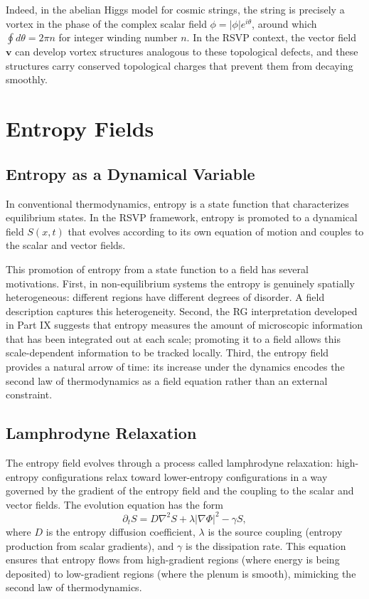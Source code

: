 \documentclass[12pt,a4paper,oneside]{book}
\theoremstyle{definition}
\theoremstyle{plain}
\theoremstyle{remark}
\begin{document}
Indeed, in the abelian Higgs model for cosmic strings, the string is precisely
a vortex in the phase of the complex scalar field $\phi = |\phi|e^{i\theta}$,
around which $\oint d\theta = 2\pi n$ for integer winding number $n$. In the
RSVP context, the vector field $\mathbf{v}$ can develop vortex structures
analogous to these topological defects, and these structures carry
conserved topological charges that prevent them from decaying smoothly.

\chapter{Entropy Fields}

\section{Entropy as a Dynamical Variable}

In conventional thermodynamics, entropy is a state function that characterizes
equilibrium states. In the RSVP framework, entropy is promoted to a dynamical
field $S(x,t)$ that evolves according to its own equation of motion and
couples to the scalar and vector fields.

This promotion of entropy from a state function to a field has several
motivations. First, in non-equilibrium systems the entropy is genuinely
spatially heterogeneous: different regions have different degrees of disorder.
A field description captures this heterogeneity. Second, the RG interpretation
developed in Part IX suggests that entropy measures the amount of microscopic
information that has been integrated out at each scale; promoting it to a
field allows this scale-dependent information to be tracked locally. Third,
the entropy field provides a natural arrow of time: its increase under the
dynamics encodes the second law of thermodynamics as a field equation rather
than an external constraint.

\section{Lamphrodyne Relaxation}

The entropy field evolves through a process called lamphrodyne relaxation:
high-entropy configurations relax toward lower-entropy configurations in a
way governed by the gradient of the entropy field and the coupling to the
scalar and vector fields. The evolution equation has the form
\begin{equation}
\partial_t S = D\nabla^2 S + \lambda|\nabla\Phi|^2 - \gamma S,
\end{equation}
where $D$ is the entropy diffusion coefficient, $\lambda$ is the source
coupling (entropy production from scalar gradients), and $\gamma$ is the
dissipation rate. This equation ensures that entropy flows from high-gradient
regions (where energy is being deposited) to low-gradient regions (where
the plenum is smooth), mimicking the second law of thermodynamics.
\end{document}
